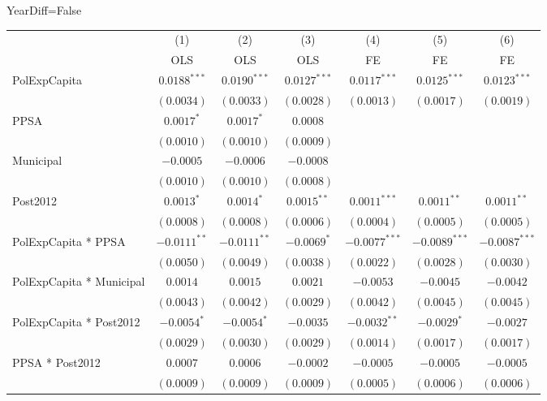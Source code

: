 \documentclass[border=10pt,varwidth=25cm]{standalone}
\renewenvironment{table}[1][]{}{}
\begin{document}
\begin{table}[H]
    \centering
    \scriptsize
    \begin{minipage}{\textwidth}
    \centering
    {\normalsize YearDiff=False}
    \vspace{6pt}
    \begin{tabular}{lcccccc}
        \toprule
         & (1) & (2) & (3) & (4) & (5) & (6) \\
         & OLS & OLS & OLS & FE & FE & FE \\
        \midrule
        PolExpCapita & $0.0188^{***}$ & $0.0190^{***}$ & $0.0127^{***}$ & $0.0117^{***}$ & $0.0125^{***}$ & $0.0123^{***}$ \\
         & $(0.0034)$ & $(0.0033)$ & $(0.0028)$ & $(0.0013)$ & $(0.0017)$ & $(0.0019)$ \\[4pt]
        PPSA & $0.0017^{*}$ & $0.0017^{*}$ & $0.0008$ &  &  &  \\
         & $(0.0010)$ & $(0.0010)$ & $(0.0009)$ &  &  &  \\[4pt]
        Municipal & $-0.0005$ & $-0.0006$ & $-0.0008$ &  &  &  \\
         & $(0.0010)$ & $(0.0010)$ & $(0.0008)$ &  &  &  \\[4pt]
        Post2012 & $0.0013^{*}$ & $0.0014^{*}$ & $0.0015^{**}$ & $0.0011^{***}$ & $0.0011^{**}$ & $0.0011^{**}$ \\
         & $(0.0008)$ & $(0.0008)$ & $(0.0006)$ & $(0.0004)$ & $(0.0005)$ & $(0.0005)$ \\[4pt]
        PolExpCapita * PPSA & $-0.0111^{**}$ & $-0.0111^{**}$ & $-0.0069^{*}$ & $-0.0077^{***}$ & $-0.0089^{***}$ & $-0.0087^{***}$ \\
         & $(0.0050)$ & $(0.0049)$ & $(0.0038)$ & $(0.0022)$ & $(0.0028)$ & $(0.0030)$ \\[4pt]
        PolExpCapita * Municipal & $0.0014$ & $0.0015$ & $0.0021$ & $-0.0053$ & $-0.0045$ & $-0.0042$ \\
         & $(0.0043)$ & $(0.0042)$ & $(0.0029)$ & $(0.0042)$ & $(0.0045)$ & $(0.0045)$ \\[4pt]
        PolExpCapita * Post2012 & $-0.0054^{*}$ & $-0.0054^{*}$ & $-0.0035$ & $-0.0032^{**}$ & $-0.0029^{*}$ & $-0.0027$ \\
         & $(0.0029)$ & $(0.0030)$ & $(0.0029)$ & $(0.0014)$ & $(0.0017)$ & $(0.0017)$ \\[4pt]
        PPSA * Post2012 & $0.0007$ & $0.0006$ & $-0.0002$ & $-0.0005$ & $-0.0005$ & $-0.0005$ \\
         & $(0.0009)$ & $(0.0009)$ & $(0.0009)$ & $(0.0005)$ & $(0.0006)$ & $(0.0006)$ \\[4pt]

\end{tabular}
\end{minipage}
\end{table}
\end{document}
